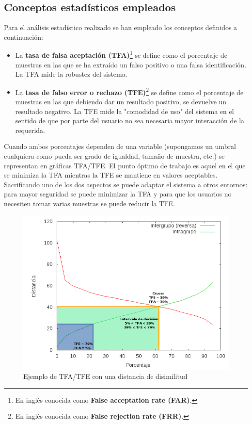 \subsection{Conceptos estadísticos empleados}
Para el análisis estadístico realizado se han empleado los conceptos definidos a continuación:
\begin{itemize}
	\item{La \textbf{tasa de falsa aceptación (TFA)}\footnote{En inglés conocida como \textbf{False acceptation rate (FAR)}.} se define como el porcentaje de muestras en las que se ha extraído un falso positivo o una falsa identificación. La TFA mide la robustez del sistema.}
	\item{La \textbf{tasa de falso error o rechazo (TFE)}\footnote{En inglés conocida como \textbf{False rejection rate (FRR)}.} se define como el porcentaje de muestras en las que debiendo dar un resultado positivo, se devuelve un resultado negativo. La TFE mide la "comodidad de uso" del sistema en el sentido de que por parte del usuario no sea necesaria mayor interacción de la requerida. }
\end {itemize}

Cuando ambos porcentajes dependen de una variable (supongamos un umbral cualquiera como pueda ser grado de igualdad, tamaño de muestra, etc.) se representan en gráficas TFA/TFE. El punto óptimo de trabajo es aquel en el que se minimiza la TFA mientras la TFE se mantiene en valores aceptables. Sacrificando uno de los dos aspectos se puede adaptar el sistema a otros entornos: para mayor seguridad se puede minimizar la TFA y para que los usuarios no necesiten tomar varias muestras se puede reducir la TFE.

\begin{figure}[!hb]
	\centering
	\includegraphics[width=12cm]{imagenes/grafica_TFA.png}
	\caption{Ejemplo de TFA/TFE con una distancia de disimilitud}
	\label{fig:example_TFA}
\end{figure}

